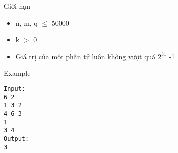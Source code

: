 Giới hạn
\begin{itemize}
	\item     n, m, q  $\le$  50000   
	\item     k $>$ 0   
	\item     Giá trị của một phần tử luôn không vượt quá $2^{31}$    -1   
\end{itemize}
Example
\begin{verbatim}
Input:
6 2
1 3 2
4 6 3
1
3 4
Output:
3
\end{verbatim}